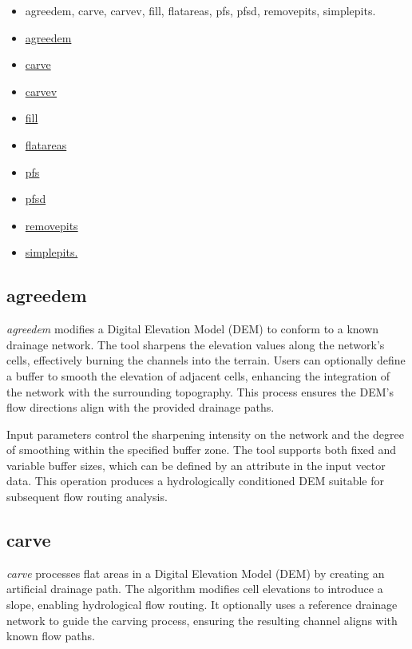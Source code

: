 \documentclass[
]{book}
\theoremstyle{definition}
\theoremstyle{definition}
\theoremstyle{definition}
\theoremstyle{definition}
\theoremstyle{remark}
\begin{document}
\begin{itemize}
\item
  agreedem, carve, carvev, fill, flatareas, pfs, pfsd, removepits, simplepits.
\item
  \hyperref[agreedem]{agreedem}
\item
  \hyperref[carve]{carve}
\item
  \hyperref[carvev]{carvev}
\item
  \hyperref[fill]{fill}
\item
  \hyperref[flatareas]{flatareas}
\item
  \hyperref[pfs]{pfs}
\item
  \hyperref[pfsd]{pfsd}
\item
  \hyperref[removepits]{removepits}
\item
  \hyperref[simplepits]{simplepits.}
\end{itemize}

\subsection{agreedem}\label{agreedem}

\emph{agreedem} modifies a Digital Elevation Model (DEM) to conform to a known drainage network. The tool sharpens the elevation values along the network's cells, effectively burning the channels into the terrain. Users can optionally define a buffer to smooth the elevation of adjacent cells, enhancing the integration of the network with the surrounding topography. This process ensures the DEM's flow directions align with the provided drainage paths.

Input parameters control the sharpening intensity on the network and the degree of smoothing within the specified buffer zone. The tool supports both fixed and variable buffer sizes, which can be defined by an attribute in the input vector data. This operation produces a hydrologically conditioned DEM suitable for subsequent flow routing analysis.

\subsection{carve}\label{carve}

\emph{carve} processes flat areas in a Digital Elevation Model (DEM) by creating an artificial drainage path. The algorithm modifies cell elevations to introduce a slope, enabling hydrological flow routing. It optionally uses a reference drainage network to guide the carving process, ensuring the resulting channel aligns with known flow paths.
\end{document}

